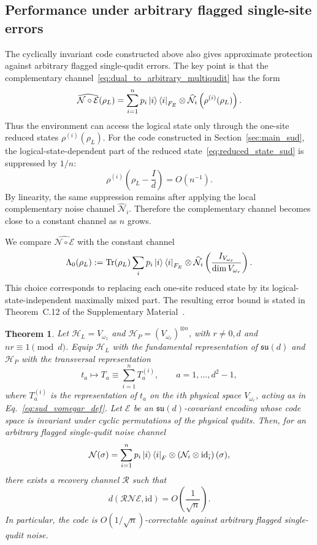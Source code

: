 \documentclass[10pt,twocolumn,superscriptaddress,aps,amsmath,amssymb,citeautoscript,floatfix,prx,longbibliography]{revtex4-2}
\newtheorem{theorem}{Theorem}
\theoremstyle{plain}
\theoremstyle{plain}
\theoremstyle{plain}
\theoremstyle{plain}
\theoremstyle{plain}
\theoremstyle{plain}
\begin{document}
\subsection{Performance under arbitrary flagged single-site errors}\label{subsec:main_arb_noise}

The cyclically invariant code constructed above also gives approximate protection against arbitrary flagged single-qudit errors. The key point is that the complementary channel~\eqref{eq:dual_to_arbitrary_multiqudit} has the form
$$
\widehat{\mathcal N\circ\mathcal E}(\rho_L)
=
\sum_{i=1}^n
p_i\ket i\bra i_{F_E}
\otimes
\widehat{\mathcal N}_i
\left(\rho^{(i)}(\rho_L)\right).
$$
Thus the environment can access the logical state only through the one-site reduced states $\rho^{(i)}(\rho_L)$. For the code constructed in Section~\ref{sec:main_sud}, the logical-state-dependent part of the reduced state~\eqref{eq:reduced_state_sud} is suppressed by $1/n$:
$$
\rho^{(i)}
\left(
\rho_L-\frac{I}{d}
\right)
=
O(n^{-1}) .
$$
By linearity, the same suppression remains after applying the local complementary noise channel $\widehat{\mathcal N}_i$. Therefore the complementary channel becomes close to a constant channel as $n$ grows.

We compare $\widehat{\mathcal N\circ\mathcal E}$ with the constant channel
$$
\Lambda_0(\rho_L)
:=
\operatorname{Tr}(\rho_L)
\sum_i
p_i\ket i\bra i_{F_E}
\otimes
\widehat{\mathcal N}_i
\left(
\frac{I_{V_{\omega_r}}}{\dim V_{\omega_r}}
\right).
$$
This choice corresponds to replacing each one-site reduced state by its logical-state-independent maximally mixed part. The resulting error bound is stated in Theorem~C.12 of the Supplementary Material~\cite{SuppMat}.

\begin{theorem}
Let $\mathcal H_L=V_{\omega_1}$ and $\mathcal H_P=(V_{\omega_r})^{\otimes n}$, with $r\neq 0,d$ and $nr\equiv 1\pmod d$. Equip $\mathcal H_L$ with the fundamental representation of $\mathfrak{su}(d)$ and $\mathcal H_P$ with the transversal representation
$$
t_a
\longmapsto
T_a
\equiv
\sum_{i=1}^n T_a^{(i)},
\qquad
a=1,\ldots,d^2-1,
$$
where $T_a^{(i)}$ is the representation of $t_a$ on the $i$th physical space $V_{\omega_r}$, acting as in Eq.~\eqref{eq:sud_vomegar_def}. Let $\mathcal E$ be an $\mathfrak{su}(d)$-covariant encoding whose code space is invariant under cyclic permutations of the physical qudits. Then, for an arbitrary flagged single-qudit noise channel
$$
\mathcal N(\sigma)
=
\sum_{i=1}^n
p_i\ket i\bra i_F
\otimes
\left(
\mathcal N_i\otimes\mathrm{id}_{\bar i}
\right)(\sigma),
$$
there exists a recovery channel $\mathcal R$ such that
$$
d(\mathcal R\mathcal N\mathcal E,\mathrm{id})
=
O\left(\frac{1}{\sqrt n}\right).
$$
In particular, the code is $O(1/\sqrt n)$-correctable against arbitrary flagged single-qudit noise.
\end{theorem}
\end{document}
